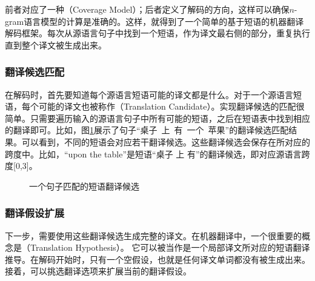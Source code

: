 \parinterval 前者对应了一种{\small{}}（Coverage Model）；后者定义了解码的方向，这样可以确保$n$-gram语言模型的计算是准确的。这样，就得到了一个简单的基于短语的机器翻译解码框架。每次从源语言句子中找到一个短语，作为译文最右侧的部分，重复执行直到整个译文被生成出来。


\subsubsection{翻译候选匹配}

\parinterval 在解码时，首先要知道每个源语言短语可能的译文都是什么。对于一个源语言短语，每个可能的译文也被称作{\small{}}（Translation Candidate）。实现翻译候选的匹配很简单。只需要遍历输入的源语言句子中所有可能的短语，之后在短语表中找到相应的翻译即可。比如，图\ref{fig:4-27}展示了句子``桌子\ 上\ 有\ 一个\ 苹果''的翻译候选匹配结果。可以看到，不同的短语会对应若干翻译候选。这些翻译候选会保存在所对应的跨度中。比如，``upon the table''是短语``桌子 上 有''的翻译候选，即对应源语言跨度[0,3]。

\begin{figure}[t]
\centering

\caption{一个句子匹配的短语翻译候选}
\label{fig:4-27}
\end{figure}


\subsubsection{翻译假设扩展}

\parinterval 下一步，需要使用这些翻译候选生成完整的译文。在机器翻译中，一个很重要的概念是{\small{}}（Translation Hypothesis）。 它可以被当作是一个局部译文所对应的短语翻译推导。在解码开始时，只有一个空假设，也就是任何译文单词都没有被生成出来。接着，可以挑选翻译选项来扩展当前的翻译假设。

